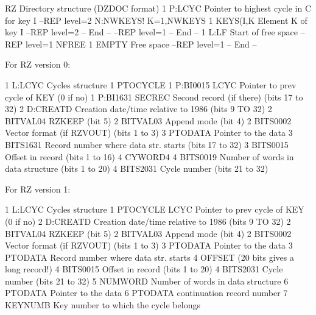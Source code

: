 \begin{XMPt}{RZ Directory structure (DZDOC format)}
     1       P:LCYC   Pointer to highest cycle in C for key I                   
   --REP level=2  N:NWKEYS! K=1,NWKEYS                                          
         1     KEYS(I,K Element K of key I                                      
   --REP level=2 -- End --                                                      
 --REP level=1 -- End --                                                        
 1         L:LF     Start of free space                                         
 --REP level=1  NFREE                                                           
     1       EMPTY    Free space                                                
 --REP level=1 -- End --                                                        


For RZ version 0:

 1         L:LCYC   Cycles structure                                            
 1         PTOCYCLE                                                             
 1         P:BI0015 LCYC Pointer to prev cycle of KEY (0 if no)                 
 1         P:BI1631 SECREC Second record (if there) (bits 17 to 32)             
 2         D:CREATD Creation date/time relative to 1986 (bits 9 TO 32)          
 2         BITVAL04 RZKEEP (bit 5)                                              
 2         BITVAL03 Append mode (bit 4)                                         
 2         BITS0002 Vector format (if RZVOUT) (bits 1 to 3)                     
 3         PTODATA  Pointer to the data                                         
 3         BITS1631 Record number where data str. starts (bits 17 to 32)        
 3         BITS0015 Offset in record (bits 1 to 16)                             
 4         CYWORD4                                                              
 4         BITS0019 Number of words in data structure (bits 1 to 20)            
 4         BITS2031 Cycle number (bits 21 to 32)                                


For RZ version 1:


 1         L:LCYC   Cycles structure                                            
 1         PTOCYCLE LCYC Pointer to prev cycle of KEY (0 if no)                 
 2         D:CREATD Creation date/time relative to 1986 (bits 9 TO 32)          
 2         BITVAL04 RZKEEP (bit 5)                                              
 2         BITVAL03 Append mode (bit 4)                                         
 2         BITS0002 Vector format (if RZVOUT) (bits 1 to 3)                     
 3         PTODATA  Pointer to the data                                         
 3         PTODATA  Record number where data str. starts 
 4         OFFSET   (20 bits gives a long record!)
 4         BITS0015 Offset in record (bits 1 to 20)                             
 4         BITS2031 Cycle number (bits 21 to 32)                                
 5         NUMWORD  Number of words in data structure
 6         PTODATA  Pointer to the data                                         
 6         PTODATA  continuation record number
 7         KEYNUMB  Key number to which the cycle belongs


\end{XMPt}

